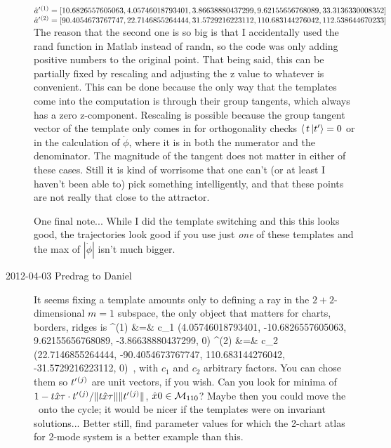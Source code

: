 \begin{description}
$\hat{a}'{}^{(1)} = [10.6826557605063, 4.05746018793401, 3.86638880437299, 9.62155656768089, 33.3136330008352]$ \\

$\hat{a}'{}^{(2)} = [90.4054673767747, 22.7146855264444, 31.5729216223112, 110.683144276042, 112.538644670233]$\\

The reason that the second one is so big is that I accidentally used the
rand function in Matlab instead of randn, so the code was only adding
positive numbers to the original point. That being said, this can be
partially fixed by rescaling and adjusting the z value to whatever is
convenient. This can be done because the only way that the templates come
into the computation is through their group tangents, which always has a
zero z-component. Rescaling is possible because the group tangent vector
of the template only comes in for orthogonality checks
$\braket{\,t\,}{\sliceTan{}{}} = 0$ or in the calculation of
$\dot{\phi}$, where it is in both the numerator and the denominator. The
magnitude of the tangent does not matter in either of these cases. Still
it is kind of worrisome that one can't (or at least I haven't been able
to) pick something intelligently, and that these points are not really
that close to the attractor.

One final note... While I did the template switching and this this looks
good, the trajectories look good if you use just \emph{one} of these
templates and the max of $|\dot{\phi}|$ isn't much bigger.

\item[2012-04-03 Predrag to Daniel] It seems fixing a template amounts only to defining a ray in the
$2 + 2$-dimensional $m=1$ subspace, the only object that matters for charts, borders, ridges is
\bea
\sliceTan{}{}^{(1)} &=& c_1 (4.05746018793401, -10.6826557605063,  9.62155656768089, -3.86638880437299, 0)
    \continue
\sliceTan{}{}^{(2)} &=& c_2 (22.7146855264444, -90.4054673767747, 110.683144276042, -31.5729216223112, 0)
\,,
\label{DanielTmpls}
\eea
with $c_1$ and $c_2$ arbitrary factors. You can chose them so
$t'_{}{}^{(j)}$ are unit vectors, if you wish. Can you look for
minima of
$1-t{\hat{x}{\tau}} \cdot t'_{}{}^{(j)}
   / \|{t{\hat{x}{\tau}}}\| \|{t'_{}{}^{(j)}}\|$, $\hat{x}{0} \in {\cal M}_{110}$?
Maybe then you could move the \template\ onto the cycle; it would be
nicer if the templates were on invariant solutions... Better still, find
parameter values for which the 2-chart atlas for 2-mode system is a
better example than this.


\end{description}
